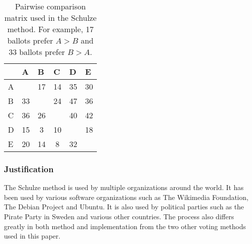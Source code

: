 \documentclass[12pt]{article}
\begin{document}
\begin{table}
\centering
\caption{Pairwise comparison matrix used in the Schulze method. For example, 17 ballots prefer $A>B$ and 33 ballots prefer $B>A$.}
\begin{tabular}{l|c|c|c|c|c|}
\cline{2-6}
 & \multicolumn{1}{l|}{A} & \multicolumn{1}{l|}{B} & \multicolumn{1}{l|}{C} & \multicolumn{1}{l|}{D} & \multicolumn{1}{l|}{E} \\ \hline
\multicolumn{1}{|l|}{A} & \cellcolor[HTML]{9B9B9B} & \cellcolor[HTML]{FFDDDD}17 & \cellcolor[HTML]{FFDDDD}14 & \cellcolor[HTML]{DDFFDD}35 & \cellcolor[HTML]{DDFFDD}30 \\ \hline
\multicolumn{1}{|l|}{B} & \cellcolor[HTML]{DDFFDD}33 & \cellcolor[HTML]{9B9B9B} & \cellcolor[HTML]{FFDDDD}24 & \cellcolor[HTML]{DDFFDD}47 & \cellcolor[HTML]{DDFFDD}36 \\ \hline
\multicolumn{1}{|l|}{C} & \cellcolor[HTML]{DDFFDD}36 & \cellcolor[HTML]{DDFFDD}26 & \cellcolor[HTML]{9B9B9B} & \cellcolor[HTML]{DDFFDD}40 & \cellcolor[HTML]{DDFFDD}42 \\ \hline
\multicolumn{1}{|l|}{D} & \cellcolor[HTML]{FFDDDD}15 & \cellcolor[HTML]{FFDDDD}3 & \cellcolor[HTML]{FFDDDD}10 & \cellcolor[HTML]{9B9B9B} & \cellcolor[HTML]{FFDDDD}18 \\ \hline
\multicolumn{1}{|l|}{E} & \cellcolor[HTML]{FFDDDD}20 & \cellcolor[HTML]{FFDDDD}14 & \cellcolor[HTML]{FFDDDD}8 & \cellcolor[HTML]{DDFFDD}32 & \cellcolor[HTML]{9B9B9B} \\ \hline
\end{tabular}
\label{tab:pairwise comparison matrix}
\end{table}
\subsubsection{Justification}
The Schulze method is used by multiple organizations around the world. It has been used by various software organizations such as The Wikimedia Foundation, The Debian Project and Ubuntu. It is also used by political parties such as the Pirate Party in Sweden and various other countries. The process also differs greatly in both method and implementation from the two other voting methods used in this paper.
\end{document}
